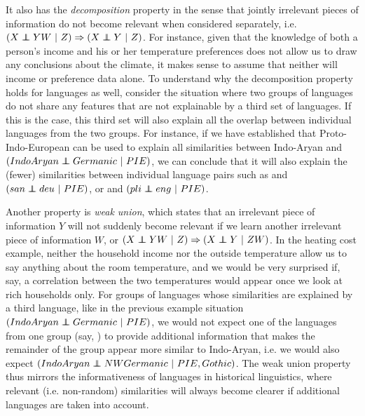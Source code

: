 It also has the \textit{decomposition} property in the sense that jointly irrelevant pieces of information do not become relevant when considered separately, i.e.\ $(X \independent YW\ |\ Z) \Rightarrow (X \independent Y\ |\ Z)$. For instance, given that the knowledge of both a person's income and his or her temperature preferences does not allow us to draw any conclusions about the climate, it makes sense to assume that neither will income or preference data alone. To understand why the decomposition property holds for languages as well, consider the situation where two groups of languages do not share any features that are not explainable by a third set of languages. If this is the case, this third set will also explain all the overlap between individual languages from the two groups. For instance, if we have established that Proto-Indo-European can be used to explain all similarities between Indo-Aryan and  $(IndoAryan \independent 
Germanic\ |\ PIE)$, we can conclude that it will also explain the (fewer) similarities between individual language pairs such as  and  $(san \independent deu\ |\ PIE)$, or  and  $(pli \independent eng\ |\ PIE)$.

Another property is \textit{weak union}, which states that an irrelevant piece of information $Y$ will not suddenly become relevant if we learn another irrelevant piece of information $W$, or $(X \independent YW\ |\ Z) \Rightarrow (X \independent Y\ |\ ZW)$. In the heating cost example, neither the household income nor the outside temperature allow us to say anything about the room temperature, and we would be very surprised if, say, a correlation between the two temperatures would appear once we look at rich households only. For groups of languages whose similarities are explained by a third language, like in the previous example situation $(IndoAryan \independent Germanic\ |\ PIE)$, we would not expect one of the languages from one group (say, ) to provide additional information that makes the remainder of the group appear more similar to Indo-Aryan, i.e. we would also expect $(IndoAryan \independent NWGermanic\ |\ PIE, Gothic)$. The weak union property thus mirrors the informativeness of languages in historical linguistics, where relevant (i.e. non-random) similarities will always become clearer if additional languages are taken into account.

